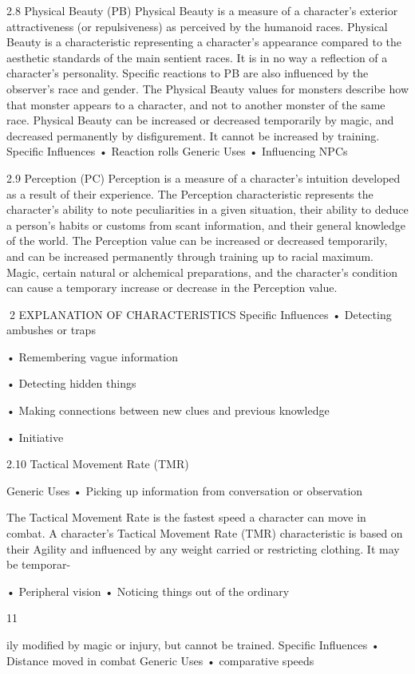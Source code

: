 \documentclass[a4paper]{article}
\begin{document}
\begin{multicols}{3}
2.8 Physical Beauty (PB)
Physical Beauty is a measure of a character’s exterior attractiveness (or repulsiveness) as perceived
by the humanoid races. Physical Beauty is a characteristic representing a character’s appearance
compared to the aesthetic standards of the main
sentient races. It is in no way a reflection of a
character’s personality. Specific reactions to PB
are also influenced by the observer’s race and
gender. The Physical Beauty values for monsters
describe how that monster appears to a character,
and not to another monster of the same race. Physical Beauty can be increased or decreased temporarily by magic, and decreased permanently by disfigurement. It cannot be increased by training.
Specific Influences
• Reaction rolls
Generic Uses
• Influencing NPCs

2.9 Perception (PC)
Perception is a measure of a character’s intuition
developed as a result of their experience. The Perception characteristic represents the character’s
ability to note peculiarities in a given situation,
their ability to deduce a person’s habits or customs
from scant information, and their general knowledge of the world.
The Perception value can be increased or decreased
temporarily, and can be increased permanently
through training up to racial maximum. Magic,
certain natural or alchemical preparations, and the
character’s condition can cause a temporary increase or decrease in the Perception value.

2 EXPLANATION OF CHARACTERISTICS
Specific Influences
• Detecting ambushes or traps

• Remembering vague information

• Detecting hidden things

• Making connections between new clues and
previous knowledge

• Initiative

2.10 Tactical Movement Rate (TMR)

Generic Uses
• Picking up information from conversation or
observation

The Tactical Movement Rate is the fastest speed a
character can move in combat. A character’s Tactical Movement Rate (TMR) characteristic is based
on their Agility and influenced by any weight
carried or restricting clothing. It may be temporar-

• Peripheral vision
• Noticing things out of the ordinary

11

ily modified by magic or injury, but cannot be
trained.
Specific Influences
• Distance moved in combat
Generic Uses
• comparative speeds


\end{multicols}
\end{document}
